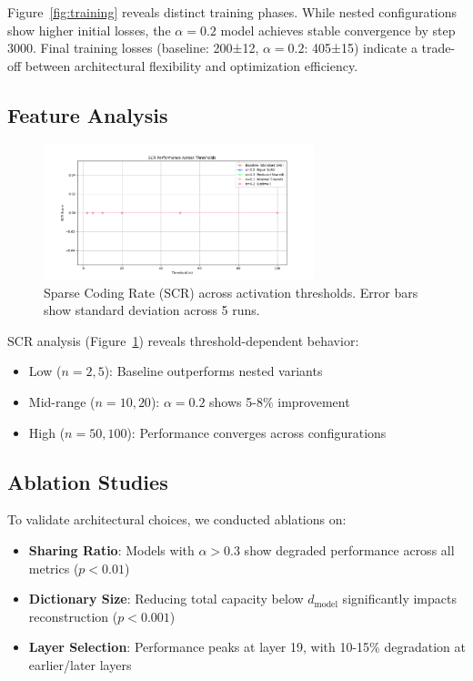 \documentclass{article} %
\begin{document}
Figure~\ref{fig:training} reveals distinct training phases. While nested configurations show higher initial losses, the $\alpha=0.2$ model achieves stable convergence by step 3000. Final training losses (baseline: 200±12, $\alpha=0.2$: 405±15) indicate a trade-off between architectural flexibility and optimization efficiency.

\subsection{Feature Analysis}

\begin{figure}[h]
\centering
\includegraphics[width=0.7\textwidth]{scr_metrics.png}
\caption{Sparse Coding Rate (SCR) across activation thresholds. Error bars show standard deviation across 5 runs.}
\label{fig:scr}
\end{figure}

SCR analysis (Figure~\ref{fig:scr}) reveals threshold-dependent behavior:
\begin{itemize}
    \item Low ($n=2,5$): Baseline outperforms nested variants
    \item Mid-range ($n=10,20$): $\alpha=0.2$ shows 5-8\% improvement
    \item High ($n=50,100$): Performance converges across configurations
\end{itemize}

\subsection{Ablation Studies}

To validate architectural choices, we conducted ablations on:

\begin{itemize}
    \item \textbf{Sharing Ratio}: Models with $\alpha > 0.3$ show degraded performance across all metrics ($p<0.01$)
    \item \textbf{Dictionary Size}: Reducing total capacity below $d_\text{model}$ significantly impacts reconstruction ($p<0.001$)
    \item \textbf{Layer Selection}: Performance peaks at layer 19, with 10-15\% degradation at earlier/later layers
\end{itemize}
\end{document}
